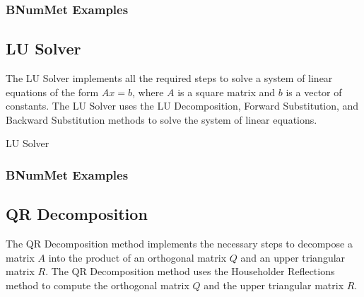 \subsubsection*{BNumMet Examples}


\subsection*{LU Solver}
The LU Solver implements all the required steps to solve a system of linear equations of the form $Ax = b$, where $A$ is a square matrix and $b$ is a vector of constants. The LU Solver uses the LU Decomposition, Forward Substitution, and Backward Substitution methods to solve the system of linear equations.

\begin{algorithm}[H] 
\label{alg:LU Solver}
\SetAlgoLined
{}
\caption{LU Solver}

\end{algorithm}
\subsubsection*{BNumMet Examples}
 

\subsection*{QR Decomposition}
The QR Decomposition method implements the necessary steps to decompose a matrix $A$ into the product of an orthogonal matrix $Q$ and an upper triangular matrix $R$. The QR Decomposition method uses the Householder Reflections method to compute the orthogonal matrix $Q$ and the upper triangular matrix $R$.


